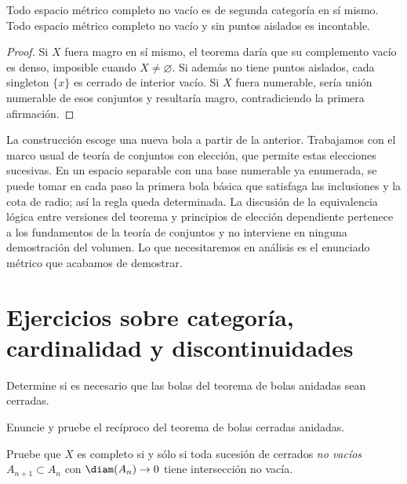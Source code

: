 \begin{corolario}\label{ch10:segunda}
Todo espacio métrico completo no vacío es de segunda categoría en sí mismo. Todo espacio métrico completo no vacío y sin puntos aislados es incontable.
\end{corolario}
\begin{proof}
Si $X$ fuera magro en sí mismo, el teorema daría que su complemento vacío es denso, imposible cuando $X\ne\varnothing$. Si además no tiene puntos aislados, cada singleton $\{x\}$ es cerrado de interior vacío. Si $X$ fuera numerable, sería unión numerable de esos conjuntos y resultaría magro, contradiciendo la primera afirmación.
\end{proof}

\begin{observacion}
La construcción escoge una nueva bola a partir de la anterior. Trabajamos con el marco usual de teoría de conjuntos con elección, que permite estas elecciones sucesivas. En un espacio separable con una base numerable ya enumerada, se puede tomar en cada paso la primera bola básica que satisfaga las inclusiones y la cota de radio; así la regla queda determinada. La discusión de la equivalencia lógica entre versiones del teorema y principios de elección dependiente pertenece a los fundamentos de la teoría de conjuntos y no interviene en ninguna demostración del volumen. Lo que necesitaremos en análisis es el enunciado métrico que acabamos de demostrar.
\end{observacion}

\section{Ejercicios sobre categoría, cardinalidad y discontinuidades}
\begin{ejercicio}\label{ej:lectura-10-1}
Determine si es necesario que las bolas del teorema de bolas anidadas sean cerradas.
\end{ejercicio}


\begin{ejercicio}\label{ej:lectura-10-2}
Enuncie y pruebe el recíproco del teorema de bolas cerradas anidadas.
\end{ejercicio}


\begin{ejercicio}\label{ej:lectura-10-3}
Pruebe que $X$ es completo si y sólo si toda sucesión de cerrados \emph{no vacíos} $A_{n+1}\subset A_n$ con $\diam(A_n)\to0$ tiene intersección no vacía.
\end{ejercicio}


